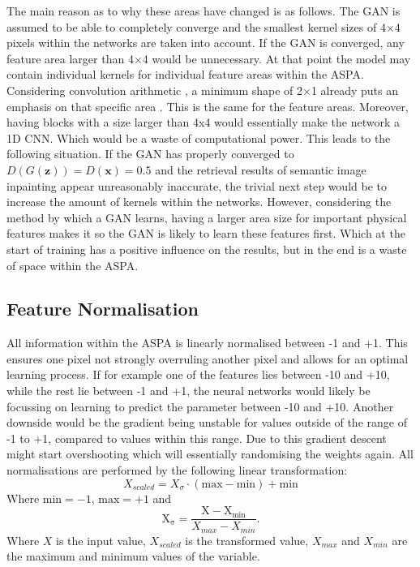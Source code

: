 The main reason as to why these areas have changed is as follows. The GAN is assumed to be able to completely converge and the smallest kernel sizes of 4$\times$4 pixels within the networks are taken into account. If the GAN is converged, any feature area larger than 4$\times$4 would be unnecessary. At that point the model may contain individual kernels for individual feature areas within the ASPA. Considering convolution arithmetic \cite{dumoulin2016guide}, a minimum shape of 2$\times$1 already puts an emphasis on that specific area . This is the same for the feature areas. Moreover, having blocks with a size larger than 4x4 would essentially make the network a 1D CNN. Which would be a waste of computational power.
This leads to the following situation. If the GAN has properly converged to $D(G(\boldsymbol{z}))=D(\boldsymbol{x})=0.5$ and the retrieval results of semantic image inpainting appear unreasonably inaccurate, the trivial next step would be to increase the amount of kernels within the networks. However, considering the method by which a GAN learns, having a larger area size for important physical features makes it so the GAN is likely to learn these features first. Which at the start of training has a positive influence on the results, but in the end is a waste of space within the ASPA.




\subsection{Feature Normalisation}
All information within the ASPA is linearly normalised between -1 and +1. This ensures one pixel not strongly overruling another pixel and allows for an optimal learning process. If for example one of the features lies between -10 and +10, while the rest lie between -1 and +1, the neural networks would likely be focussing on learning to predict the parameter between -10 and +10. Another downside would be the gradient being unstable for values outside of the range of -1 to +1, compared to values within this range. Due to this gradient descent might start overshooting which will essentially randomising the weights again. All normalisations are performed by the following linear transformation:
\begin{equation}
    X_{scaled}=X_{\sigma} \cdot (\mathrm{max}-\mathrm{min})+\mathrm{min}
\end{equation}
Where $\mathrm{min}=-1$, $\mathrm{max}=+1$ and
\begin{equation}
    \mathrm{X_{\sigma}} = \frac{\mathrm{X - X_{min}}}{X_{max}-X_{min}}.
\end{equation}
Where $X$ is the input value, $X_{scaled}$ is the transformed value, $X_{max}$ and $X_{min}$ are the maximum and minimum values of the variable.

